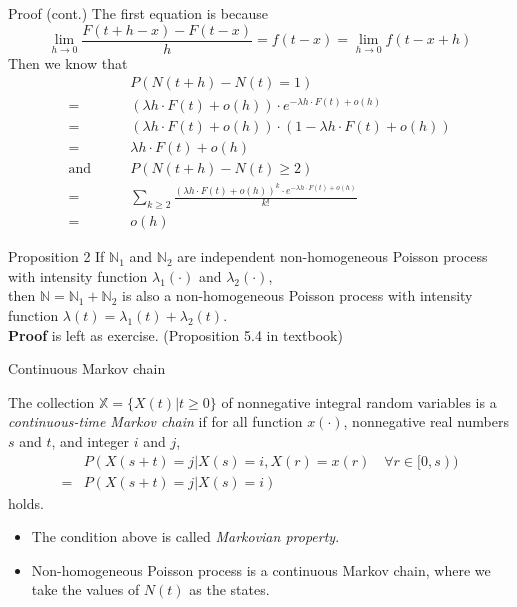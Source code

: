 \documentclass[mathserif]{beamer}
\begin{document}
\begin{frame}{Proof (cont.)}
The first equation is because
\[
\lim_{h\to 0}\frac{F(t+h-x)-F(t-x)}{h} = f(t-x) = \lim_{h\to 0}f(t-x+h)
\]
Then we know that
\begin{align*}
& P(N(t+h)-N(t) = 1) \\
= & (\lambda h\cdot F(t) + o(h))\cdot e^{-\lambda h\cdot F(t) + o(h)} \\
= & (\lambda h\cdot F(t) + o(h))\cdot (1 - \lambda h\cdot F(t) + o(h)) \\
= & \lambda h\cdot F(t) + o(h) \\
\text{and}\qquad & P(N(t+h)-N(t)\geq 2) \\
= & \sum_{k\geq 2}\frac{(\lambda h\cdot F(t) + o(h))^k \cdot e^{-\lambda h\cdot F(t) + o(h)}}{k!} \\
= & o(h)
\end{align*}
\end{frame}

\begin{frame}{Proposition 2}
If $\mathbb{N}_1$ and $\mathbb{N}_2$ are independent non-homogeneous Poisson process with intensity function $\lambda_1(\cdot)$ and $\lambda_2(\cdot)$, \\
then $\mathbb{N} = \mathbb{N}_1 + \mathbb{N}_2$ is also a non-homogeneous Poisson process with intensity function $\lambda(t) = \lambda_1(t) + \lambda_2(t)$.\\
\vspace{\baselineskip}
\textbf{Proof} is left as exercise. (Proposition 5.4 in textbook)
\end{frame}

\begin{frame}{Continuous Markov chain}
\begin{definition}
The collection $\mathbb{X} = \{X(t) | t\geq 0\}$ of nonnegative integral random variables is a \emph{continuous-time Markov chain} if for all function $x(\cdot)$, nonnegative real numbers $s$ and $t$, and integer $i$ and $j$,
\begin{align*}
& P(X(s+t) = j | X(s) = i, X(r) = x(r) \quad\forall r \in [0,s)) \\
= & P(X(s+t) = j | X(s) = i)
\end{align*}
holds.
\end{definition}
\begin{itemize}
\item The condition above is called \emph{Markovian property}.
\item Non-homogeneous Poisson process is a continuous Markov chain, where we take the values of $N(t)$ as the states.
\end{itemize}
\end{frame}
\end{document}
